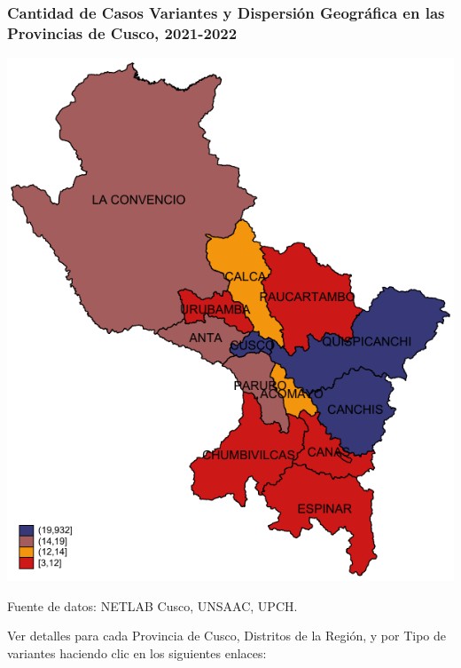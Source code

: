 \documentclass[xcolor=table]{beamer}
\begin{document}
\begin{frame}[label=mapa_variantes]
\frametitle{Cantidad de Casos Variantes y Dispersión Geográfica en las Provincias de Cusco, 2021-2022}
\begin{center}
\includegraphics[width=0.4\linewidth]{../figuras/variantes_provincial.pdf}
\end{center}
{\tiny Fuente de datos: NETLAB Cusco, UNSAAC, UPCH.}
	
	Ver detalles para cada  Provincia de Cusco, Distritos de la Región, y por Tipo de variantes haciendo clic en los siguientes enlaces:
	\hyperlink{mapa_provincia_cusco}{} \hyperlink{mapa_distrital}{} \hyperlink{mapa_lambda}{}
	\hyperlink{mapa_gamma}{}
	\hyperlink{mapa_delta}{}
	\hyperlink{mapa_delta}{}
\end{frame}

	
\end{document}
